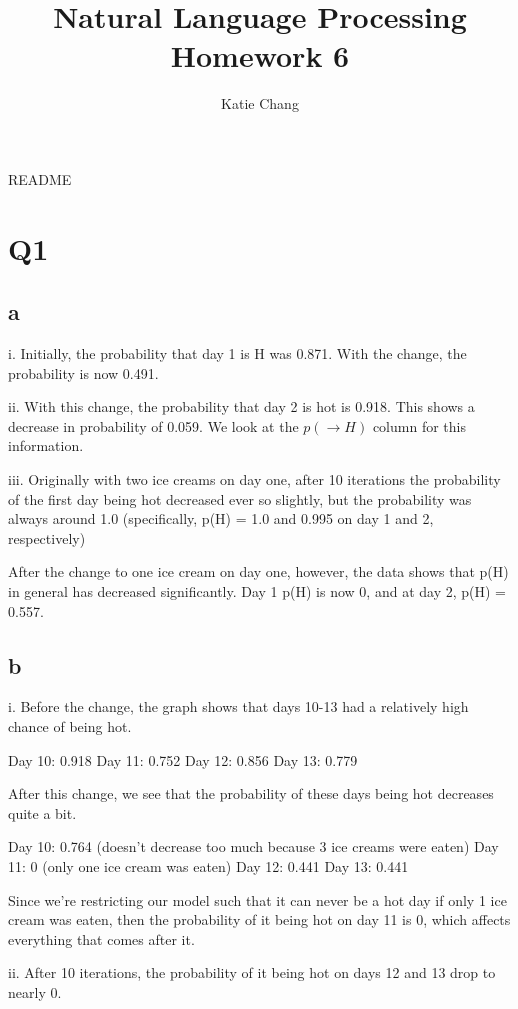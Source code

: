 \documentclass[12pt, letterpaper]{article}
\title{Natural Language Processing Homework 6}
\author{Katie Chang}
\begin{document}
\maketitle

README

\section{Q1}
\subsection{a}
i. Initially, the probability that day 1 is H was 0.871. With the change, the probability is now 0.491.

ii. With this change, the probability that day 2 is hot is 0.918. This shows a decrease in probability of 0.059.
We look at the $p(\rightarrow H)$ column for this information.

iii. Originally with two ice creams on day one, after 10 iterations the probability of the first day being hot decreased ever so slightly, but the probability was always around 1.0 (specifically, p(H) = 1.0 and 0.995 on day 1 and 2, respectively)

After the change to one ice cream on day one, however, the data shows that p(H) in general has decreased significantly. Day 1 p(H) is now 0, and at day 2, p(H) = 0.557.

\subsection{b}

i. Before the change, the graph shows that days 10-13 had a relatively high chance of being hot.

Day 10: 0.918
Day 11: 0.752
Day 12: 0.856
Day 13: 0.779

After this change, we see that the probability of these days being hot decreases quite a bit.

Day 10: 0.764 (doesn't decrease too much because 3 ice creams were eaten)
Day 11: 0 (only one ice cream was eaten)
Day 12: 0.441
Day 13: 0.441

Since we're restricting our model such that it can never be a hot day if only 1 ice cream was eaten, then the probability of it being hot on day 11 is 0, which affects everything that comes after it.

ii. After 10 iterations, the probability of it being hot on days 12 and 13 drop to nearly 0. 
\end{document}
